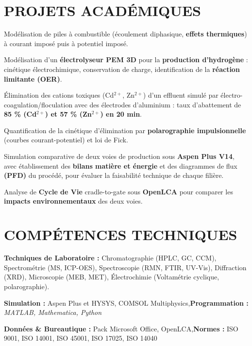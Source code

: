 \documentclass[10pt]{article}
\begin{document}
\section{PROJETS ACADÉMIQUES}
\begin{bul}
\item Modélisation de piles à combustible (écoulement diphasique, \textbf{effets thermiques}) à courant imposé puis à potentiel imposé.
\item Modélisation d'un \textbf{électrolyseur PEM 3D} pour la \textbf{production d'hydrogène} : cinétique électrochimique, conservation de charge, identification de la \textbf{réaction limitante (OER)}.
\end{bul}
\begin{bul}
\item Élimination des cations toxiques (Cd$^{2+}$, Zn$^{2+}$) d'un effluent simulé par électro-coagulation/floculation avec des électrodes d'aluminium : taux d'abattement de \textbf{85 \% (Cd$^{2+}$) et 57 \% (Zn$^{2+}$) en 20 min}.
\item Quantification de la cinétique d'élimination par \textbf{polarographie impulsionnelle} (courbes courant-potentiel) et loi de Fick.
\end{bul}
\begin{bul}
\item Simulation comparative de deux voies de production sous \textbf{Aspen Plus V14}, avec établissement des \textbf{bilans matière et énergie} et des diagrammes de flux \textbf{(PFD)} du procédé, pour évaluer la faisabilité technique de chaque filière.
\item Analyse de \textbf{Cycle de Vie} cradle-to-gate sous \textbf{OpenLCA} pour comparer les \textbf{impacts environnementaux} des deux voies.
\end{bul}

\section{COMPÉTENCES TECHNIQUES}
\begin{bul}
\item \textbf{Techniques de Laboratoire :} Chromatographie (HPLC, GC, CCM), Spectrométrie (MS, ICP-OES), Spectroscopie (RMN, FTIR, UV-Vis), Diffraction (XRD), Microscopie (MEB, MET), Électrochimie (Voltamétrie cyclique, polarographie).
\item \textbf{Simulation :} Aspen Plus et HYSYS, COMSOL Multiphysics\sep\textbf{Programmation :} \textit{MATLAB, Mathematica, Python}
\item \textbf{Données \& Bureautique :} Pack Microsoft Office, OpenLCA\sep\textbf{Normes :} ISO 9001, ISO 14001, ISO 45001, ISO 17025, ISO 14040
\end{bul}
\end{document}
